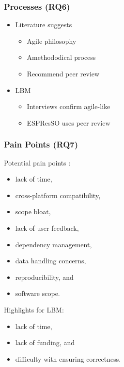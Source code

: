 \documentclass[usenames,dvipsnames]{beamer}
\begin{document}
\begin{frame}

  \frametitle{Processes (RQ6)}

  \begin{itemize}
    \item Literature suggests
    \begin{itemize}
      \item Agile philosophy \citep{CarverEtAl2007, Segal2005}
      \item Amethododical process \citep{Kelly2013}
      \item Recommend peer review \citep{HerouxEtAl2008, OrvizEtAl2017,
      USGS2019}
    \end{itemize}
    \item LBM
    \begin{itemize}
      \item Interviews confirm agile-like
      \item ESPResSO uses peer review
    \end{itemize}
  \end{itemize}

\end{frame}
  

\begin{frame}

  \frametitle{Pain Points (RQ7)}

  Potential pain points \citep{WieseEtAl2019, PintoEtAl2018}:
  \begin{itemize}
    \item lack of time, 
    \item cross-platform compatibility, 
    \item scope bloat, 
    \item lack of user feedback, 
    \item dependency management, 
    \item data handling concerns, 
    \item reproducibility, and 
    \item software scope. 
  \end{itemize}

  Highlights for LBM:
  \begin{itemize}
    \item lack of time, 
    \item lack of funding, and 
    \item difficulty with ensuring correctness.
  \end{itemize}

\end{frame}
  
\end{document}
